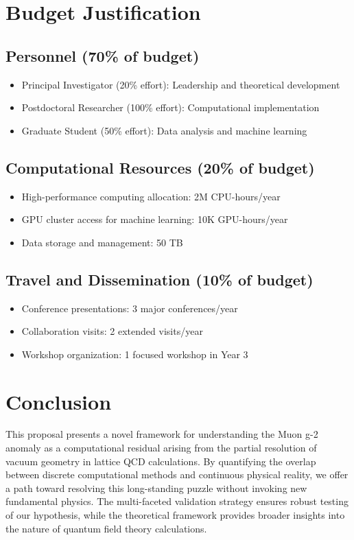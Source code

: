 ﻿\documentclass[12pt]{article}
\theoremstyle{definition}
\theoremstyle{plain}
\begin{document}
\section{Budget Justification}


\subsection{Personnel (70\% of budget)}
\begin{itemize}
    \item Principal Investigator (20\% effort): Leadership and theoretical development
    \item Postdoctoral Researcher (100\% effort): Computational implementation
    \item Graduate Student (50\% effort): Data analysis and machine learning
\end{itemize}


\subsection{Computational Resources (20\% of budget)}
\begin{itemize}
    \item High-performance computing allocation: 2M CPU-hours/year
    \item GPU cluster access for machine learning: 10K GPU-hours/year
    \item Data storage and management: 50 TB
\end{itemize}


\subsection{Travel and Dissemination (10\% of budget)}
\begin{itemize}
    \item Conference presentations: 3 major conferences/year
    \item Collaboration visits: 2 extended visits/year
    \item Workshop organization: 1 focused workshop in Year 3
\end{itemize}


\section{Conclusion}


This proposal presents a novel framework for understanding the Muon g-2 anomaly as a computational residual arising from the partial resolution of vacuum geometry in lattice QCD calculations. By quantifying the overlap between discrete computational methods and continuous physical reality, we offer a path toward resolving this long-standing puzzle without invoking new fundamental physics. The multi-faceted validation strategy ensures robust testing of our hypothesis, while the theoretical framework provides broader insights into the nature of quantum field theory calculations.
\end{document}
